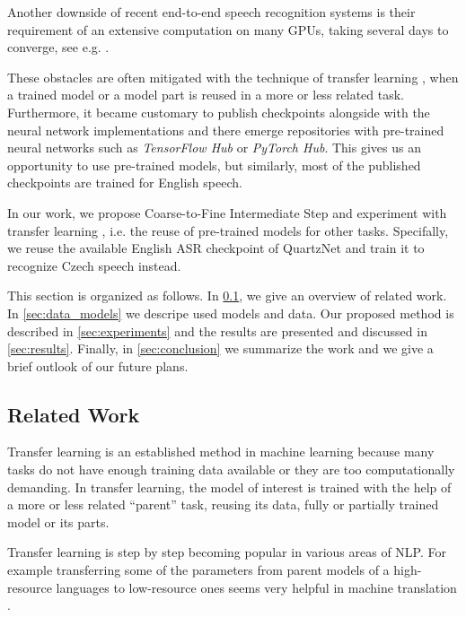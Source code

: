 Another downside of recent end-to-end speech recognition systems is their requirement of an extensive computation on many GPUs, taking several days to converge, see e.g. . 

These obstacles  are often mitigated with the technique of transfer learning , when a trained model or a model part is reused in a more or less related task.
Furthermore, it became customary to publish checkpoints alongside with the neural network implementations and 
there emerge repositories with pre-trained neural networks such as \textit{TensorFlow Hub} or \textit{PyTorch
Hub}. This gives us an opportunity to use pre-trained models, but similarly, most of the published checkpoints are trained for English speech.

In our work, we propose Coarse-to-Fine Intermediate Step and experiment with transfer learning , i.e. the reuse of pre-trained models for other tasks. Specifally,
we reuse the available English ASR checkpoint of QuartzNet  and train it to recognize Czech speech instead.

This section is organized as follows. In \cref{asr:related_work}, we give an overview of related work. In \cref{sec:data_models} we descripe used models and data. Our proposed method is described in \cref{sec:experiments} and the results are presented and discussed in \cref{sec:results}.
Finally, in \cref{sec:conclusion} we summarize the work and we give a brief outlook of our future plans.


\subsection{Related Work}
\label{asr:related_work}

Transfer learning  is an established method in machine learning because many tasks do not have enough training data available or they are too computationally demanding. In transfer learning, the model of interest is trained with the help of a more or less related ``parent'' task, reusing its data, fully or partially trained model or its parts.

Transfer learning is step by step becoming popular in various areas of NLP. 
For example transferring some of the parameters from parent models of a high-resource languages to low-resource ones seems very helpful in machine translation .

